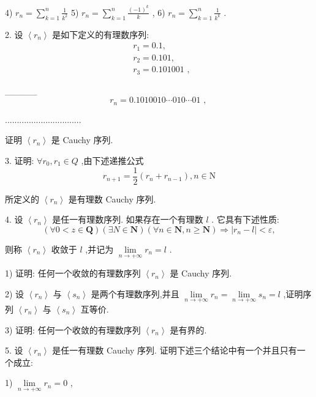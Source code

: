 4) ${r}_{n} = \mathop{\sum }\limits_{{k = 1}}^{n}\frac{1}{{k}^{2}}$ 5) ${r}_{n} = \mathop{\sum }\limits_{{k = 1}}^{n}\frac{{\left( -1\right) }^{k}}{k}$ , 6) ${r}_{n} = \mathop{\sum }\limits_{{k = 1}}^{n}\frac{1}{{k}^{k}}$ .

2. 设 $\left\langle  {r}_{n}\right\rangle$ 是如下定义的有理数序列:
\begin{align*}
	&{r}_{1} = {0.1},\\
	&{r}_{2} = {0.101},\\
	&{r}_{3} = {0.101001}\text{ , }
\end{align*}

\_\_\_\_\_
$${r}_{n} = {0.1010010}\cdots {010}\cdots {01}\text{ , }$$

................................

证明 $\left\langle  {r}_{n}\right\rangle$ 是 Cauchy 序列.

3. 证明: $\forall {r}_{0},{r}_{1} \in  Q$ ,由下述递推公式
$${r}_{n + 1} = \frac{1}{2}\left( {{r}_{n} + {r}_{n - 1}}\right) ,n \in  \mathrm{N}$$

所定义的 $\left\langle  {r}_{n}\right\rangle$ 是有理数 Cauchy 序列.

4. 设 $\left\langle  {r}_{n}\right\rangle$ 是任一有理数序列. 如果存在一个有理数 $l$ . 它具有下述性质:
$$\left( {\forall 0 < z \in  \mathbf{Q}}\right) \left( {\exists N \in  \mathbf{N}}\right) \left( {\forall n \in  \mathbf{N},n \geq  \mathbf{N}}\right)  \Rightarrow  \left| {{r}_{n} - l}\right|  < \varepsilon ,$$

则称 $\left\langle  {r}_{n}\right\rangle$ 收敛于 $l$ ,并记为 $\mathop{\lim }\limits_{{n \rightarrow   + \infty }}{r}_{n} = l$ .

1) 证明: 任何一个收敛的有理数序列 $\left\langle  {r}_{n}\right\rangle$ 是 Cauchy 序列.

2) 设 $\left\langle  {r}_{n}\right\rangle$ 与 $\left\langle  {s}_{n}\right\rangle$ 是两个有理数序列,并且 $\mathop{\lim }\limits_{{n \rightarrow   + \infty }}{r}_{n} = \mathop{\lim }\limits_{{n \rightarrow   + \infty }}{s}_{n} = l$ ,证明序列 $\left\langle  {r}_{n}\right\rangle$ 与 $\left\langle  {s}_{n}\right\rangle$ 互等价.

3) 证明: 任何一个收敛的有理数序列 $\left\langle  {r}_{n}\right\rangle$ 是有界的.

5. 设 $\left\langle  {r}_{n}\right\rangle$ 是任一有理数 Cauchy 序列. 证明下述三个结论中有一个并且只有一个成立:

1) $\mathop{\lim }\limits_{{n \rightarrow   + \infty }}{r}_{n} = 0$ ,

